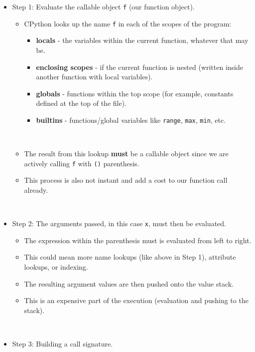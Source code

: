 \documentclass[../main.tex]{subfiles}
\begin{document}
    \begin{itemize}
        \item Step 1: Evaluate the callable object \verb|f| (our function object).
        \begin{itemize}
            \item CPython looks up the name \verb|f| in each of the scopes of the program:
            \begin{itemize}
                \item \textbf{locals} - the variables within the current function, whatever that may be.
                \item \textbf{enclosing scopes} - if the current function is nested (written inside another function with local variables).
                \item \textbf{globals} - functions within the top scope (for example, constants defined at the top of the file).
                \item \textbf{builtins} - functions/global variables like \verb|range|, \verb|max|, \verb|min|, etc.
            \end{itemize}\\
            \item The result from this lookup \textbf{must} be a callable object since we are actively calling \verb|f| with \verb|()| parenthesis.
            \item This process is also not instant and add a cost to our function call already.
        \end{itemize}\\
        \item Step 2: The arguments passed, in this case \verb|x|, must then be evaluated.
        \begin{itemize}
            \item The expression within the parenthesis must is evaluated from left to right.
            \item This could mean more name lookups (like above in Step 1), attribute lookups, or indexing.
            \item The resulting argument values are then pushed onto the value stack.
            \item This is an expensive part of the execution (evaluation and pushing to the stack).
        \end{itemize}\\
        \item Step 3: Building a call signature.
        \begin{itemize}

\end{itemize}
\end{itemize}
\end{document}

